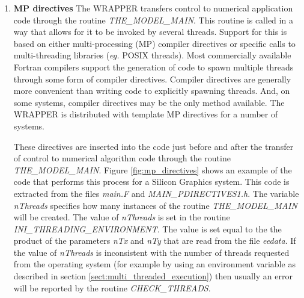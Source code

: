 \begin{enumerate}
\item {\bf MP directives}
  The WRAPPER transfers control to numerical application code through
  the routine {\em THE\_MODEL\_MAIN}. This routine is called in a way
  that allows for it to be invoked by several threads. Support for
  this is based on either multi-processing (MP) compiler directives or
  specific calls to multi-threading libraries (\textit{eg.} POSIX
  threads).  Most commercially available Fortran compilers support the
  generation of code to spawn multiple threads through some form of
  compiler directives.  Compiler directives are generally more
  convenient than writing code to explicitly spawning threads.  And,
  on some systems, compiler directives may be the only method
  available.  The WRAPPER is distributed with template MP directives
  for a number of systems.

  These directives are inserted into the code just before and after
  the transfer of control to numerical algorithm code through the
  routine {\em THE\_MODEL\_MAIN}. Figure \ref{fig:mp_directives} shows
  an example of the code that performs this process for a Silicon
  Graphics system.  This code is extracted from the files {\em main.F}
  and {\em MAIN\_PDIRECTIVES1.h}. The variable {\em nThreads}
  specifies how many instances of the routine {\em THE\_MODEL\_MAIN}
  will be created. The value of {\em nThreads} is set in the routine
  {\em INI\_THREADING\_ENVIRONMENT}. The value is set equal to the the
  product of the parameters {\em nTx} and {\em nTy} that are read from
  the file {\em eedata}. If the value of {\em nThreads} is
  inconsistent with the number of threads requested from the operating
  system (for example by using an environment variable as described in
  section \ref{sect:multi_threaded_execution}) then usually an error
  will be reported by the routine {\em CHECK\_THREADS}.



\end{enumerate}
